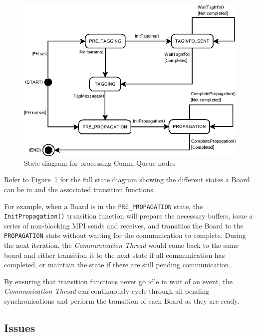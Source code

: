 \begin{figure}[h]
 \centering
  \includegraphics[scale=0.50]{CommNode.png}
 \caption{State diagram for processing Comm Queue nodes}
 \label{fig:commstate}
\end{figure}

Refer to Figure~\ref{fig:commstate} for the full state diagram showing the different states a Board can be in and the associated transition functions.

For example, when a Board is in the \texttt{PRE\_PROPAGATION} state, the \texttt{InitPropagation()} transition function will prepare the necessary buffers, issue a series of non-blocking MPI sends and receives, and transitios the Board to the \texttt{PROPAGATION} state without waiting for the communication to complete. During the next iteration, the \textit{Communication Thread} would come back to the same board and either transition it to the next state if all communication has completed, or maintain the state if there are still pending communication. 

By ensuring that transition functions never go idle in wait of an event, the \textit{Communication Thread} can continuously cycle through all pending synchronisations and perform the transition of each Board as they are ready.









\subsection{Issues}

